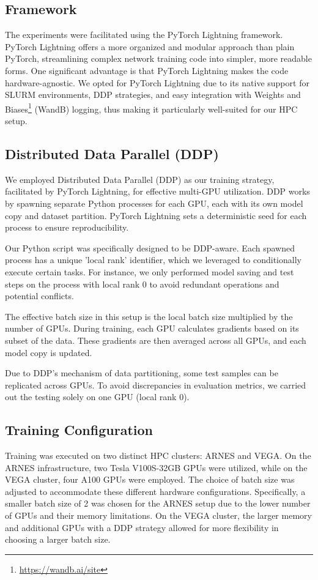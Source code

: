 \documentclass[a4paper,12pt,openright]{book}
\begin{document}
\subsection{Framework}

The experiments were facilitated using the PyTorch Lightning framework. PyTorch Lightning offers a more organized and modular approach than plain PyTorch, streamlining complex network training code into simpler, more readable forms. One significant advantage is that PyTorch Lightning makes the code hardware-agnostic. We opted for PyTorch Lightning due to its native support for SLURM environments, DDP strategies, and easy integration with Weights and Biases\footnote{\label{wandb}\url{https://wandb.ai/site}} (WandB) logging, thus making it particularly well-suited for our HPC setup.




\subsection{Distributed Data Parallel (DDP)}

We employed Distributed Data Parallel (DDP) as our training strategy, facilitated by PyTorch Lightning, for effective multi-GPU utilization. DDP works by spawning separate Python processes for each GPU, each with its own model copy and dataset partition. PyTorch Lightning sets a deterministic seed for each process to ensure reproducibility.

Our Python script was specifically designed to be DDP-aware. Each spawned process has a unique 'local rank' identifier, which we leveraged to conditionally execute certain tasks. For instance, we only performed model saving and test steps on the process with local rank 0 to avoid redundant operations and potential conflicts. 

The effective batch size in this setup is the local batch size multiplied by the number of GPUs. During training, each GPU calculates gradients based on its subset of the data. These gradients are then averaged across all GPUs, and each model copy is updated.

Due to DDP's mechanism of data partitioning, some test samples can be replicated across GPUs. To avoid discrepancies in evaluation metrics, we carried out the testing solely on one GPU (local rank 0).



\subsection{Training Configuration}
\label{training}
Training was executed on two distinct HPC clusters: ARNES and VEGA. On the ARNES infrastructure, two Tesla V100S-32GB GPUs were utilized, while on the VEGA cluster, four A100 GPUs were employed. The choice of batch size was adjusted to accommodate these different hardware configurations. Specifically, a smaller batch size of 2 was chosen for the ARNES setup due to the lower number of GPUs and their memory limitations. On the VEGA cluster, the larger memory and additional GPUs with a DDP strategy allowed for more flexibility in choosing a larger batch size.
\end{document}
